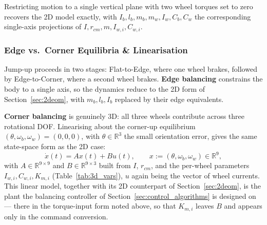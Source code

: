 Restricting motion to a single vertical plane with two wheel torques set to
zero recovers the 2D model exactly, with $I_b, l_b, m_b, m_w, I_w,
C_b, C_w$ the corresponding single-axis projections of $I, r_{cm}, m, I_{w,i},
C_{w,i}$.

\subsubsection{Edge vs.\ Corner Equilibria \& Linearisation}

Jump-up proceeds in two stages: Flat-to-Edge, where one wheel brakes,
followed by Edge-to-Corner, where a second wheel brakes. \textbf{Edge
balancing} constrains the body to a single axis, so the dynamics reduce to
the 2D form of Section~\ref{sec:2deom}, with $m_b, l_b, I_b$ replaced by their
edge equivalents.

\textbf{Corner balancing} is genuinely 3D: all three wheels contribute across
three rotational DOF. Linearising about the corner-up equilibrium
$(\theta,\omega_b,\omega_w)=(0,0,0)$, with $\theta\in\mathbb{R}^3$ the small
orientation error, gives the same state-space form as the 2D case:
\begin{equation}
\dot x(t) = Ax(t) + Bu(t), \qquad x := (\theta,\omega_b,\omega_w) \in \mathbb{R}^9,
\end{equation}
with $A \in \mathbb{R}^{9\times9}$ and $B \in \mathbb{R}^{9\times3}$ built
from $I$, $r_{cm}$, and the per-wheel parameters $I_{w,i}, C_{w,i}, K_{m,i}$
(Table~\ref{tab:3d_vars}), $u$ again being the vector of wheel currents. This
linear model, together with its 2D counterpart of Section~\ref{sec:2deom}, is
the plant the balancing controller of
Section~\ref{sec:control_algorithms} is designed on --- there in the
torque-input form noted above, so that $K_{m,i}$ leaves $B$ and appears only in
the command conversion.
